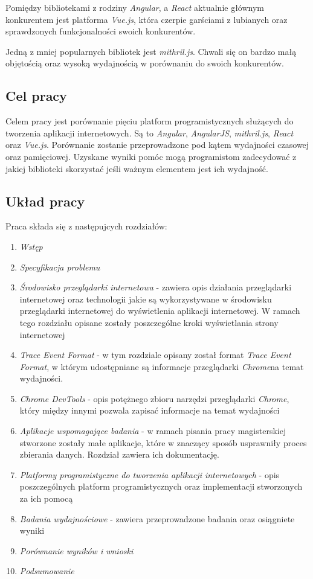 \documentclass[polish, twoside, 12pt]{mwart}
\begin{document}
Pomiędzy bibliotekami z rodziny \emph{Angular}, a \emph{React} aktualnie głównym konkurentem jest platforma \emph{Vue.js}, która czerpie garściami z lubianych oraz sprawdzonych funkcjonalności swoich konkurentów.

Jedną z mniej popularnych bibliotek jest \emph{mithril.js}. Chwali się on bardzo małą objętością oraz wysoką wydajnością w porównaniu do swoich konkurentów.

\subsection{Cel pracy}

Celem pracy jest porównanie pięciu platform programistycznych służących do tworzenia aplikacji internetowych. Są to \emph{Angular}, \emph{AngularJS},
\emph{mithril.js}, \emph{React} oraz \emph{Vue.js}. Porównanie zostanie przeprowadzone pod kątem wydajności czasowej oraz pamięciowej. Uzyskane wyniki pomóc mogą programistom zadecydować z jakiej biblioteki skorzystać jeśli ważnym elementem jest ich wydajność.

\subsection{Układ pracy}

Praca składa się z następujcych rozdziałów:

\begin{enumerate}
  \item \emph{Wstęp}
  \item \emph{Specyfikacja problemu}
  \item \emph{Środowisko przeglądarki internetowa} - zawiera opis działania przeglądarki internetowej oraz technologii jakie są wykorzystywane w środowisku przeglądarki internetowej do wyświetlenia aplikacji internetowej. W ramach tego rozdziału opisane zostały poszczególne kroki wyświetlania strony internetowej
  \item \emph{Trace Event Format} - w tym rozdziale opisany został format \emph{Trace Event Format}, w którym udostępniane są informacje przeglądarki \emph{Chrome}na temat wydajności.
  \item \emph{Chrome DevTools} - opis potężnego zbioru narzędzi przeglądarki \emph{Chrome}, który między innymi pozwala zapisać informacje na temat wydajności
  \item \emph{Aplikacje wspomagające badania} - w ramach pisania pracy magisterskiej stworzone zostały małe aplikacje, które w znaczący sposób usprawniły proces zbierania danych. Rozdział zawiera ich dokumentację.
  \item \emph{Platformy programistyczne do tworzenia aplikacji internetowych} - opis poszczególnych platform programistycznych oraz implementacji stworzonych za ich pomocą
  \item \emph{Badania wydajnościowe} - zawiera przeprowadzone badania oraz osiągniete wyniki
  \item \emph{Porównanie wyników i wnioski}
  \item \emph{Podsumowanie}
\end{enumerate}
\end{document}
